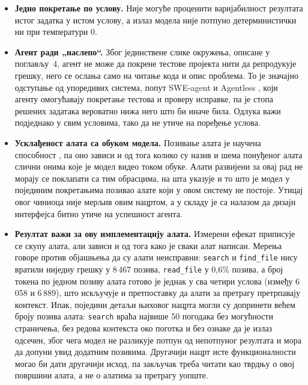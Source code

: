 \documentclass[12pt,a4paper]{report}
\begin{document}
\begin{itemize}
		задатак није решен, што оптерећује трошак по решеном задатку у условима
		без претраге. Анализа осетљивости даје исти закључак за хипотезе Х1 и Х3.
		\item \textbf{Једно покретање по услову.} Није могуће проценити
		варијабилност резултата истог задатка у истом услову, а излаз модела
		није потпуно детерминистички ни при температури 0.
		\item \textbf{Агент ради „наслепо“.} Због јединствене слике окружења,
		описане у поглављу~4, агент не може да покрене тестове пројекта нити да
		репродукује грешку, него се ослања само на читање кода и опис проблема.
		То је значајно одступање од упоредивих система, попут SWE-agent
		\parencite{yang2024sweagent} и Agentless \parencite{xia2025agentless},
		који агенту омогућавају покретање тестова и проверу исправке, па је
		стопа решених задатака вероватно нижа него што би иначе била. Одлука
		важи подједнако у свим условима, тако да не утиче на поређење услова.
		\item \textbf{Усклађеност алата са обуком модела.} Позивање алата је
		научена способност \parencite{schick2023toolformer}, па оно зависи и од
		тога колико су назив и шема понуђеног алата слични онима које је модел
		видео током обуке. Алати развијени за овај рад не морају се поклапати са
		тим обрасцима, на шта указује и то што је модел у појединим покретањима
		позивао алате који у овом систему не постоје. Утицај овог чиниоца није
		мерљив овим нацртом, а у складу је са налазом
		\textcite{yang2024sweagent} да дизајн интерфејса битно утиче на
		успешност агента.
		\item \textbf{Резултат важи за ову имплементацију алата.} Измерени ефекат
		приписује се скупу алата, али зависи и од тога како је сваки алат
		написан. Мерења говоре против објашњења да су алати неисправни:
		\texttt{search} и \texttt{find\_file} нису вратили ниједну грешку у
		8\,467 позива, \texttt{read\_file} у 0,6\% позива, а број токена по
		једном позиву алата готово је једнак у сва четири услова (између 6\,058 и
		6\,889), што искључује и претпоставку да алати за претрагу претрпавају
		контекст. Ипак, поједини детаљи њиховог нацрта могли су допринети већем
		броју позива алата: \texttt{search} враћа највише 50 погодака без могућности
		страничења, без редова контекста око поготка и без ознаке да је излаз
		одсечен, због чега модел не разликује потпун од непотпуног резултата и
		мора да допуни увид додатним позивима. Другачији нацрт исте
		функционалности могао би дати другачији исход, па закључак треба читати
		као тврдњу о овој површини алата, а не о алатима за претрагу уопште.

\end{itemize}
\end{document}
